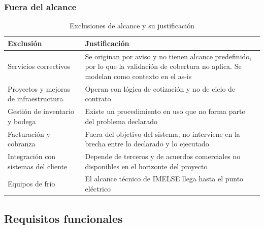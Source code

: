 \documentclass[10pt,letterpaper]{article}
\begin{document}
\subsubsection*{Fuera del alcance}

\begin{table}[H]
\centering
\small
\begin{tabular}{@{}p{5cm}p{9.5cm}@{}}
\toprule
\textbf{Exclusión} & \textbf{Justificación} \\
\midrule
Servicios correctivos & Se originan por aviso y no tienen alcance predefinido, por lo que la validación de cobertura no aplica. Se modelan como contexto en el as-is \\
Proyectos y mejoras de infraestructura & Operan con lógica de cotización y no de ciclo de contrato \\
Gestión de inventario y bodega & Existe un procedimiento en uso que no forma parte del problema declarado \\
Facturación y cobranza & Fuera del objetivo del sistema; no interviene en la brecha entre lo declarado y lo ejecutado \\
Integración con sistemas del cliente & Depende de terceros y de acuerdos comerciales no disponibles en el horizonte del proyecto \\
Equipos de frío & El alcance técnico de IMELSE llega hasta el punto eléctrico \\
\bottomrule
\end{tabular}
\caption{Exclusiones de alcance y su justificación}
\end{table}

\subsection{Requisitos funcionales}
\end{document}
